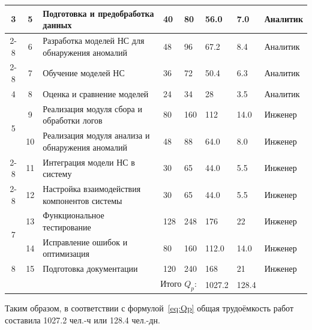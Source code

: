 {\begin{longtable}{|c|c|p{4cm}|p{1.6cm}|p{1.6cm}|p{1.5cm}|p{1.6cm}|p{2.5cm}|}
    \multirow{3}{*}{3}
        & 5  & Подготовка и предобработка данных
        & 40 & 80  & 56.0  & 7.0  & Аналитик \\ \cline{2-8}
        & 6  & Разработка моделей НС для обнаружения аномалий
        & 48 & 96  & 67.2  & 8.4  & Аналитик \\ \cline{2-8}
        & 7 & Обучение моделей НС
        & 36 & 72  & 50.4  & 6.3  & Аналитик \\ \hline

    4 & 8 & Оценка и сравнение моделей & 24 & 34  & 28  & 3.5  & Аналитик \\ \hline
        

    \multirow{2}{*}{5}
        & 9 & Реализация модуля сбора и обработки логов
        & 80 & 160  & 112  & 14.0  & Инженер \\ \cline{2-8}
        & 10 & Реализация модуля анализа и обнаружения аномалий
        & 48 & 88  & 64.0  & 8.0  & Инженер \\ \cline{2-8}

    \multirow{2}{*}{6}
        & 11 & Интеграция модели НС в систему
        & 30 & 65  & 44.0  & 5.5  & Инженер \\ \cline{2-8}
        & 12 & Настройка взаимодействия компонентов системы
        & 30 & 65  & 44.0  & 5.5  & Инженер \\ \hline

    \multirow{2}{*}{7}
        & 13 & Функциональное тестирование
        & 128 & 248 & 176  & 22 & Инженер \\ \cline{2-8}
        & 14 & Исправление ошибок и оптимизация
        & 80 & 160 & 112.0 & 14.0 & Инженер \\ \hline

    8 & 15 & Подготовка документации & 120 & 240 & 168  & 21 & Инженер \\ \hline

    \multicolumn{5}{|r|}{Итого $Q_p$:}
        & 1027.2
        & 128.4
        & \\ \hline

\end{longtable}
}

Таким образом, в соответствии с формулой~\eqref{eq:Qp} общая трудоёмкость работ составила 1027.2 чел.-ч или 128.4 чел.-дн.